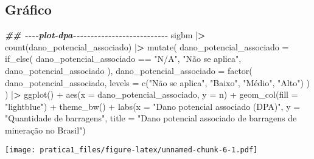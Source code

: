 \documentclass[
]{article}
\newenvironment{Shaded}{\begin{snugshade}}{\end{snugshade}}
\newcommand{\AttributeTok}[1]{\textcolor[rgb]{0.77,0.63,0.00}{#1}}
\newcommand{\DocumentationTok}[1]{\textcolor[rgb]{0.56,0.35,0.01}{\textbf{\textit{#1}}}}
\newcommand{\ErrorTok}[1]{\textcolor[rgb]{0.64,0.00,0.00}{\textbf{#1}}}
\newcommand{\FunctionTok}[1]{\textcolor[rgb]{0.00,0.00,0.00}{#1}}
\newcommand{\NormalTok}[1]{#1}
\newcommand{\SpecialCharTok}[1]{\textcolor[rgb]{0.00,0.00,0.00}{#1}}
\newcommand{\StringTok}[1]{\textcolor[rgb]{0.31,0.60,0.02}{#1}}
\begin{document}
\hypertarget{gruxe1fico}{%
\subsection{Gráfico}\label{gruxe1fico}}

\begin{Shaded}
\begin{Highlighting}[]
\DocumentationTok{\#\# {-}{-}{-}{-}plot{-}dpa{-}{-}{-}{-}{-}{-}{-}{-}{-}{-}{-}{-}{-}{-}{-}{-}{-}{-}{-}{-}{-}{-}{-}{-}{-}{-}{-}}
\NormalTok{sigbm }\SpecialCharTok{|}\ErrorTok{\textgreater{}}
  \FunctionTok{count}\NormalTok{(dano\_potencial\_associado) }\SpecialCharTok{|}\ErrorTok{\textgreater{}}
    \FunctionTok{mutate}\NormalTok{(}
    \AttributeTok{dano\_potencial\_associado =} \FunctionTok{if\_else}\NormalTok{(}
\NormalTok{      dano\_potencial\_associado }\SpecialCharTok{==} \StringTok{"N/A"}\NormalTok{,}
      \StringTok{"Não se aplica"}\NormalTok{,}
\NormalTok{      dano\_potencial\_associado}
\NormalTok{    ),}
    \AttributeTok{dano\_potencial\_associado =} \FunctionTok{factor}\NormalTok{(}
\NormalTok{      dano\_potencial\_associado,}
      \AttributeTok{levels =} \FunctionTok{c}\NormalTok{(}\StringTok{"Não se aplica"}\NormalTok{, }\StringTok{"Baixo"}\NormalTok{, }\StringTok{"Médio"}\NormalTok{, }\StringTok{"Alto"}\NormalTok{)}
\NormalTok{    )}
\NormalTok{  ) }\SpecialCharTok{|}\ErrorTok{\textgreater{}}
  \FunctionTok{ggplot}\NormalTok{() }\SpecialCharTok{+}
  \FunctionTok{aes}\NormalTok{(}\AttributeTok{x =}\NormalTok{ dano\_potencial\_associado, }\AttributeTok{y =}\NormalTok{ n) }\SpecialCharTok{+}
  \FunctionTok{geom\_col}\NormalTok{(}\AttributeTok{fill =} \StringTok{"lightblue"}\NormalTok{) }\SpecialCharTok{+}
  \FunctionTok{theme\_bw}\NormalTok{() }\SpecialCharTok{+}
  \FunctionTok{labs}\NormalTok{(}\AttributeTok{x =} \StringTok{"Dano potencial associado (DPA)"}\NormalTok{, }\AttributeTok{y =} \StringTok{"Quantidade de barragens"}\NormalTok{,}
       \AttributeTok{title =} \StringTok{"Dano potencial associado de barragens de mineração no Brasil"}\NormalTok{)}
\end{Highlighting}
\end{Shaded}

\texttt{[image: pratica1\_files/figure-latex/unnamed-chunk-6-1.pdf]}
\end{document}
